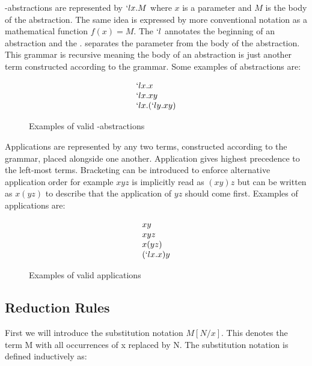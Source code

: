   \lam-abstractions are represented by $`lx.M$ where $x$ is a
  parameter and $M$ is the body of the abstraction. The same idea is
  expressed by more conventional notation as a mathematical function
  $f(x) = M$. The $`l$ annotates the beginning of an abstraction and
  the $.$ separates the parameter from the body of the abstraction.
  This grammar is recursive meaning the body of an abstraction is just
  another term constructed according to the grammar. Some examples of
  abstractions are:
  
  \begin{figure}[!h]
    \[
      \begin{array}{l}
      `lx.x \\
      `lx.xy \\
      `lx.(`ly.xy)
      \end{array}
    \]
  \caption{Examples of valid \lam-abstractions}
  \end{figure}
  
  Applications are represented by any two terms, constructed according to
  the grammar, placed alongside one another. Application gives highest
  precedence to the left-most terms. Bracketing can be introduced to enforce 
  alternative application order for example $xyz$ is implicitly read as 
  $(xy)z$ but can be written as $x(yz)$ to describe that the application of 
  $yz$ should come first. Examples of applications are:
    \begin{figure}[!h]
      \[
        \begin{array}{l}
        xy \\
        xyz \\
        x(yz) \\
        (`lx.x)y
        \end{array}
      \]
    \caption{Examples of valid applications}
    \end{figure}

\subsection{Reduction Rules}

  First we will introduce the substitution notation $M[N/x]$. This denotes 
  the term M with all occurrences of x replaced by N. The substitution 
  notation is defined inductively as:
   
    \begin{figure}[!h]
    \end{figure}

